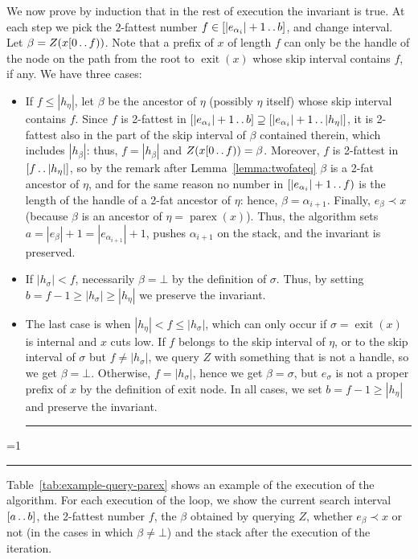 \documentclass[a4paper]{article}
\newcounter{noqed}
\newcommand{\qed}{ \ifmmode\mbox{
}\fi\rule[-.05em]{.3em}{.7em}\setcounter{noqed}{0}}
\newenvironment{proof}[1][{}]{\noindent{\bf Proof#1.
}\setcounter{noqed}{1}}{\ifnum\value{noqed}=1\qed\fi\par\medskip}
\newcommand{\exit}[1]{\operatorname{exit}(#1)}
\newcommand{\parex}[1]{\operatorname{parex}(#1)}
\newcommand{\?}{\mskip1.5mu}
\def\..{\,\mathpunct{\ldotp\ldotp}} %
\begin{document}
\begin{proof}
We now prove by induction that in the rest of execution the invariant is true.
At each step we pick the
$2$-fattest number $f\in[|e_{\alpha_i}|+1\..b]$, and change interval. Let
$\beta=Z(x[0\..f))$. Note that a prefix of $x$ of length $f$ can only be the handle of the
node on the path from the root to $\exit x$ whose skip interval contains $f$, if any. 
We have three cases:
\begin{itemize}
  \item If $f\leq |h_\eta|$, let $\beta$ be the ancestor of $\eta$ (possibly $\eta$ itself) whose skip interval contains $f$.
  Since $f$ is 2-fattest in
  $[|e_{\alpha_i}|+1\..b]\supseteq[|e_{\alpha_i}|+1\..|h_\eta|]$, it is 2-fattest also in the part of the 
  skip interval of $\beta$ contained therein, which includes $|h_\beta|$: thus, $f=|h_\beta|$ and $Z(x[0\..f))=\beta$.
  Moreover, $f$ is 2-fattest in $[f\..|h_\eta|]$, so by the remark after Lemma~\ref{lemma:twofateq} $\beta$ is a 2-fat ancestor of $\eta$,
  and for the same reason no number in $[|e_{\alpha_i}|+1\..f)$ is the length of the handle of a 2-fat ancestor of $\eta$: 
  hence, $\beta=\alpha_{i+1}$.
  Finally, $e_\beta\prec x$ (because $\beta$ is an ancestor of $\eta=\parex x$). Thus, the algorithm sets
  $a=|e_\beta|+1=|e_{\alpha_{i+1}}|+1$, pushes $\alpha_{i+1}$ on the stack, and the invariant is preserved.
  \item If $|h_\sigma|<f$, necessarily
  $\beta=\bot$ by the definition of $\sigma$. Thus, by setting $b=f-1\geq|h_\sigma|\geq |h_\eta|$  we
  preserve the invariant.
  \item The last case is when $|h_\eta|< f\leq |h_\sigma|$, which can only occur if $\sigma=\exit x$ is
  internal and $x$ cuts low. If $f$ belongs to the skip interval of $\eta$, or to the skip interval of $\sigma$ 
  but $f\neq|h_\sigma|$, we query $Z$ with something
  that is not a handle, so we get $\beta=\bot$. Otherwise, $f=|h_\sigma|$, hence we get $\beta=\sigma$,
  but $e_\sigma$ is not a proper prefix of $x$ by the definition of exit node. In all cases, we set $b=f-1\geq |h_\eta|$
  and preserve the invariant.       
  \qed
\end{itemize}
\end{proof}

Table~\ref{tab:example-query-parex} shows an example of the execution of the algorithm. For each
execution of the loop, we show the current search interval $[a\..b]$, the 2-fattest number $f$,
the $\beta$ obtained by querying $Z$, whether $e_\beta\prec x$ or not (in the cases in which
$\beta\neq\bot$) and the stack after the execution of the iteration. 
\end{document}
